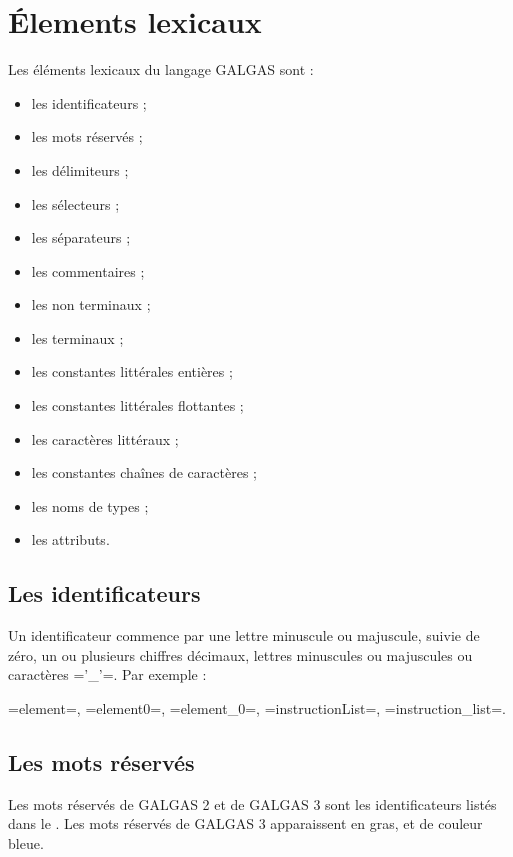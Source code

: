
\chapter{Élements lexicaux}

Les éléments lexicaux du langage GALGAS sont :
\begin{itemize}
  \item les identificateurs ;
  \item les mots réservés ;
  \item les délimiteurs ;
  \item les sélecteurs ;
  \item les séparateurs ;
  \item les commentaires ;
  \item les non terminaux ;
  \item les terminaux ;
  \item les constantes littérales entières ;
  \item les constantes littérales flottantes ;
  \item les caractères littéraux  ;
  \item les constantes chaînes de caractères ;
  \item les noms de types ;
  \item les attributs.
\end{itemize}


\section{Les identificateurs}

Un identificateur commence par une lettre minuscule ou majuscule, suivie de zéro, un ou plusieurs chiffres décimaux, lettres minuscules ou majuscules ou caractères \ggs='_'=. Par exemple :

\ggs=element=, \ggs=element0=, \ggs=element_0=, \ggs=instructionList=, \ggs=instruction_list=.

\section{Les mots réservés}

Les mots réservés de GALGAS 2 et de GALGAS 3 sont les identificateurs listés dans le . Les mots réservés de GALGAS 3 apparaissent en gras, et de couleur bleue.

